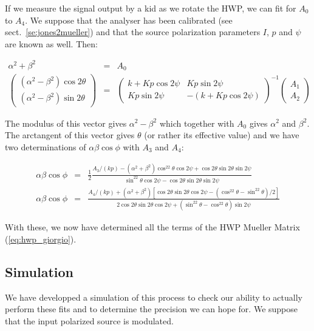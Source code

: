 \documentclass[a4paper,10pt]{article}
\begin{document}
If we measure the signal output by a kid as we rotate the HWP, we can fit for
$A_0$ to $A_4$. We suppose that the analyser has been calibrated (see
sect.~\ref{se:jones2mueller}) and that the source polarization parameters $I$,
$p$ and $\psi$ are known as well. Then:

\begin{eqnarray}
\alpha^2+\beta^2 &=& A_0 \\
\left(\begin{array}{l}
(\alpha^2-\beta^2)\cos2\theta\\(\alpha^2-\beta^2)\sin2\theta\end{array}\right) &= &
\left(\begin{array}{ll}
k+Kp\cos2\psi & Kp\sin2\psi\\
Kp\sin2\psi & -(k+Kp\cos2\psi)\end{array}\right)^{-1}
\left(\begin{array}{c} A_1\\A_2\end{array}\right)
\label{eq:alpha_beta_theta}
\end{eqnarray}

The modulus of this vector gives $\alpha^2-\beta^2$ which together with $A_0$
gives $\alpha^2$ and $\beta^2$. The arctangent of this vector gives $\theta$ (or
rather its effective value) and we have two determinations of
$\alpha\beta\cos\phi$ with $A_3$ and $A_4$:

\begin{eqnarray}
\alpha\beta\cos\phi &=& \frac{1}{2}\frac{A_3/(kp) - (\alpha^2+\beta^2)\cos^22\theta\cos2\psi+\cos2\theta\sin2\theta\sin2\psi}{\sin^22\theta\cos2\psi-\cos2\theta\sin2\theta\sin2\psi}
\\
\alpha\beta\cos\phi &=& \frac{A_4/(kp) +(\alpha^2+\beta^2)[\cos2\theta\sin2\theta\cos2\psi-(\cos^22\theta-\sin^22\theta)/2]}{2\cos2\theta\sin2\theta\cos2\psi+(\sin^22\theta-\cos^22\theta)\sin2\psi}
\end{eqnarray}

With these, we now have determined all the terms of the HWP Mueller Matrix (\ref{eq:hwp_giorgio}).

\subsection{Simulation}

We have developped a simulation of this process to check our ability to actually
perform these fits and to determine the precision we can hope for. We suppose
that the input polarized source is modulated.

\begin{thebibliography}{}
\end{thebibliography}
\end{document}
